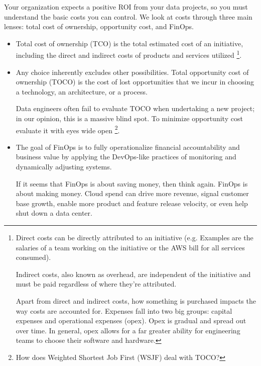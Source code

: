 \begin{itemize}
    Your organization expects a positive ROI from your
    data projects, so you must understand the basic costs
    you can control. We look at costs through three main
    lenses: total cost of ownership, opportunity cost,
    and FinOps.

    \begin{itemize}
        \item Total cost of ownership (TCO) is the total
        estimated cost of an initiative, including
        the direct and indirect costs of products and
        services utilized
        \footnote{
            Direct costs can be directly attributed to an
            initiative (e.g. Examples are the salaries of
            a team working on the initiative or the AWS bill
            for all services consumed).
            
            Indirect costs, also
            known as overhead, are independent of the
            initiative and must be paid regardless of where
            they're attributed.

            Apart from direct and indirect costs, how
            something is purchased impacts the way costs are
            accounted for. Expenses fall into two big groups:
            capital expenses and operational expenses (opex).
            Opex is gradual and spread out over time.
            In general, opex allows for a far greater ability for
            engineering teams to choose their software and hardware.
        }.

        \item Any choice inherently excludes other possibilities.
        Total opportunity cost of ownership  (TOCO) is the cost of
        lost opportunities that we incur in choosing a technology,
        an architecture, or a process.

        Data engineers often fail to evaluate TOCO when undertaking
        a new project; in our opinion, this is a massive blind spot.
        To minimize opportunity cost evaluate it with eyes wide open
        \footnote{
            How does Weighted Shortest Job First (WSJF) deal with
            TOCO?
        }.

        \item The goal of FinOps is to fully operationalize
        financial accountability and business value by
        applying the DevOps-like practices of monitoring and
        dynamically adjusting systems.

        If it seems that FinOps is about saving money,
        then think again. FinOps is about making money.
        Cloud spend can drive more revenue, signal customer
        base growth, enable more product and feature release
        velocity, or even help shut down a data center.
    \end{itemize}



\end{itemize}
